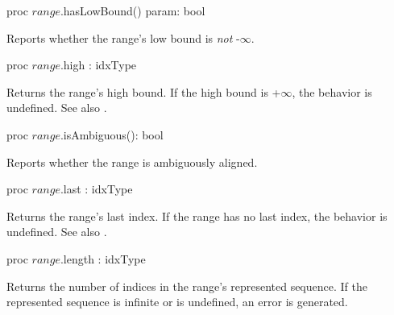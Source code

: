 \begin{protohead}
proc $range$.hasLowBound() param: bool
\end{protohead}
\begin{protobody}
Reports whether the range's low bound is \emph{not} -$\infty$.
\end{protobody}

\begin{protohead}
proc $range$.high : idxType
\end{protohead}
\begin{protobody}
Returns the range's high bound.
If the high bound is +$\infty$, the behavior is undefined.
See also .
\end{protobody}


\begin{protohead}
proc $range$.isAmbiguous(): bool
\end{protohead}
\begin{protobody}
Reports whether the range is ambiguously aligned.
\end{protobody}

\begin{protohead}
proc $range$.last : idxType
\end{protohead}
\begin{protobody}
Returns the range's last index.
If the range has no last index, the behavior is undefined.
See also .
\end{protobody}

\begin{protohead}
proc $range$.length : idxType
\end{protohead}
\begin{protobody}
Returns the number of indices in the range's represented sequence.
If the represented sequence is infinite or is undefined,
an error is generated.
\end{protobody}

